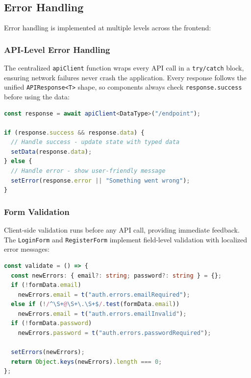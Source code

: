 \documentclass[12pt,a4paper]{article}
\begin{document}
\subsection{Error Handling}

Error handling is implemented at multiple levels across the frontend:

\subsubsection{API-Level Error Handling}

The centralized \texttt{apiClient} function wraps every API call in a \texttt{try/catch} block, ensuring network failures never crash the application. Every response follows the unified \texttt{APIResponse<T>} shape, so components always check \texttt{response.success} before using the data:

\begin{lstlisting}[language=TypeScript,title={Unified error handling pattern}]
const response = await apiClient<DataType>("/endpoint");

if (response.success && response.data) {
  // Handle success - update state with typed data
  setData(response.data);
} else {
  // Handle error - show user-friendly message
  setError(response.error || "Something went wrong");
}
\end{lstlisting}

\subsubsection{Form Validation}

Client-side validation runs before any API call, providing immediate feedback. The \texttt{LoginForm} and \texttt{RegisterForm} implement field-level validation with localized error messages:

\begin{lstlisting}[language=TypeScript,title={Client-side validation (from LoginForm.tsx)}]
const validate = () => {
  const newErrors: { email?: string; password?: string } = {};
  if (!formData.email)
    newErrors.email = t("auth.errors.emailRequired");
  else if (!/^\S+@\S+\.\S+$/.test(formData.email))
    newErrors.email = t("auth.errors.emailInvalid");
  if (!formData.password)
    newErrors.password = t("auth.errors.passwordRequired");

  setErrors(newErrors);
  return Object.keys(newErrors).length === 0;
};
\end{lstlisting}
\end{document}
